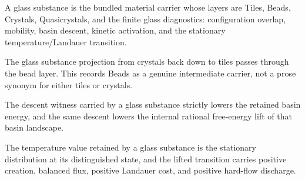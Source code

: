 \begin{proposition}\label{thm:glass-substance-bundle}\leanok{}
A glass substance is the bundled material carrier whose layers are
Tiles, Beads, Crystals, Quasicrystals, and the finite glass diagnostics:
configuration overlap, mobility, basin descent, kinetic activation, and the
stationary temperature/Landauer transition.
\end{proposition}

\begin{theorem}\label{thm:glass-beads-between-tiles-and-crystals}\leanok{}
The glass substance projection from crystals back down to tiles passes through
the bead layer.  This records Beads as a genuine intermediate carrier, not a
prose synonym for either tiles or crystals.
\end{theorem}

\begin{theorem}\label{thm:glass-substance-descent-lowers-energy}\leanok{}
The descent witness carried by a glass substance strictly lowers the retained
basin energy, and the same descent lowers the internal rational free-energy
lift of that basin landscape.
\end{theorem}

\begin{theorem}\label{thm:glass-substance-temperature}\leanok{}
The temperature value retained by a glass substance is the stationary
distribution at its distinguished state, and the lifted transition carries
positive creation, balanced flux, positive Landauer cost, and positive
hard-flow discharge.
\end{theorem}

